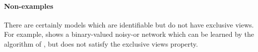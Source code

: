 \paragraph{Non-examples}
\label{sec:non-example}

There are certainly models which are identifiable but do not have exclusive views.
For example,  shows
  a binary-valued noisy-or network which can be
  learned by the algorithm of \citet{halpern13noisyor},
  but does not satisfy the exclusive views property.
